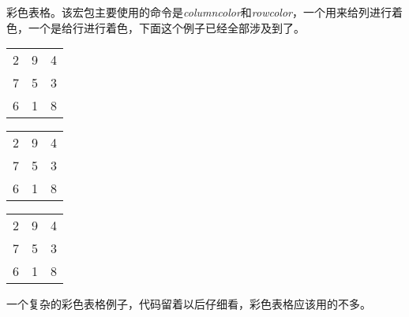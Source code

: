 彩色表格。该宏包主要使用的命令是\emph{columncolor}和\emph{rowcolor}，一个用来给列进行着色，一个是给行进行着色，下面这个例子已经全部涉及到了。

\begin{codeshow}
    \centering
    \begin{tabular}{ccc}
        \rowcolor[gray]{.9}
        2&9&4\\
        \rowcolor[gray]{.8}
        7&5&3\\
        \rowcolor[gray]{.7}
        6&1&8\\
    \end{tabular}
\end{codeshow}

\begin{codeshow}
    \centering
    \begin{tabular}%
        {>{\columncolor[gray]{.9}}c%
        >{\columncolor[gray]{.8}}c%
        >{\columncolor[gray]{.7}}c}
        2&9&4\\
        7&5&3\\
        6&1&8\\
    \end{tabular}
\end{codeshow}

\begin{codeshow}
    \centering
    \begin{tabular}{ccc}
        \cellcolor[rgb]{.9,.9,.9}2&
        \cellcolor[rgb]{.8,.9,.9}9&
        \cellcolor[rgb]{.7,.9,.9}4\\
        \cellcolor[rgb]{.9,.8,.9}7&
        \cellcolor[rgb]{.8,.8,.9}5&
        \cellcolor[rgb]{.7,.8,.9}3\\
        \cellcolor[rgb]{.9,.7,.9}6&
        \cellcolor[rgb]{.8,.7,.9}1&
        \cellcolor[rgb]{.7,.7,.9}8\\
    \end{tabular}
\end{codeshow}

一个复杂的彩色表格例子，代码留着以后仔细看，彩色表格应该用的不多。

